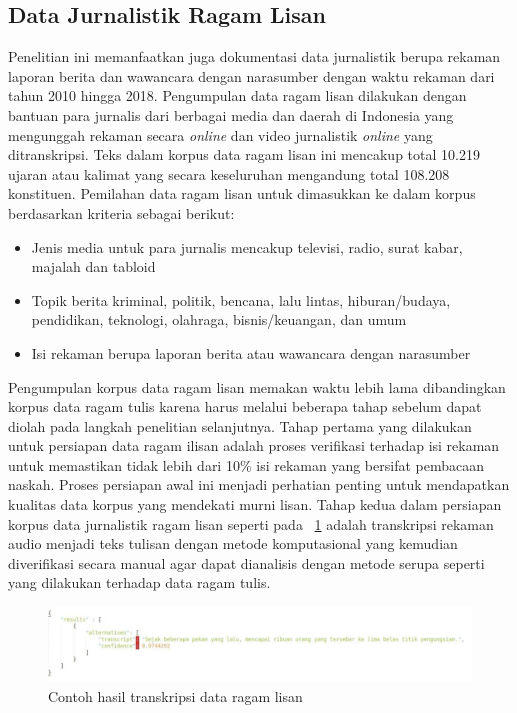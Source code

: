 \subsection{Data Jurnalistik Ragam Lisan}
Penelitian ini memanfaatkan juga dokumentasi data jurnalistik berupa rekaman laporan berita dan wawancara dengan narasumber dengan waktu rekaman dari tahun 2010 hingga 2018. Pengumpulan data ragam lisan dilakukan dengan bantuan para jurnalis dari berbagai media dan daerah di Indonesia yang mengunggah rekaman secara \textit{online} dan video jurnalistik \textit{online} yang ditranskripsi. Teks dalam korpus data ragam lisan ini mencakup total 10.219 ujaran atau kalimat yang secara keseluruhan mengandung total 108.208 konstituen. Pemilahan data ragam lisan untuk dimasukkan ke dalam korpus berdasarkan kriteria sebagai berikut:

\begin{itemize}
	\item Jenis media untuk para jurnalis mencakup televisi, radio, surat kabar, majalah dan tabloid
	\item Topik berita kriminal, politik, bencana, lalu lintas, hiburan/budaya, pendidikan, teknologi, olahraga, bisnis/keuangan, dan umum
	\item Isi rekaman berupa laporan berita atau wawancara dengan narasumber
\end{itemize}

Pengumpulan korpus data ragam lisan memakan waktu lebih lama dibandingkan korpus data ragam tulis karena harus melalui beberapa tahap sebelum dapat diolah pada langkah penelitian selanjutnya. Tahap pertama yang dilakukan untuk persiapan data ragam ilisan adalah proses verifikasi terhadap isi rekaman untuk memastikan tidak lebih dari 10\% isi rekaman yang bersifat pembacaan naskah. Proses persiapan awal ini menjadi perhatian penting untuk mendapatkan kualitas data korpus yang mendekati murni lisan. Tahap kedua dalam persiapan korpus data jurnalistik ragam lisan seperti pada \pic~\ref{fig:contoh-transkripsi-lisan} adalah transkripsi rekaman audio menjadi teks tulisan dengan metode komputasional yang kemudian diverifikasi secara manual agar dapat dianalisis dengan metode serupa seperti yang dilakukan terhadap data ragam tulis. 

\begin{figure}
	\centering \includegraphics[width=1
	\textwidth] {pics/contoh-transkripsi-lisan.png} 
	\caption{Contoh hasil transkripsi data ragam lisan} 
	\label{fig:contoh-transkripsi-lisan} 
\end{figure}

